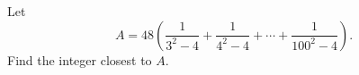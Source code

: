 Let
\[A=48\left(\dfrac{1}{3^2-4}+\dfrac{1}{4^2-4}+\cdots+\dfrac{1}{100^2-4}\right).\]
Find the integer closest to $A$.
